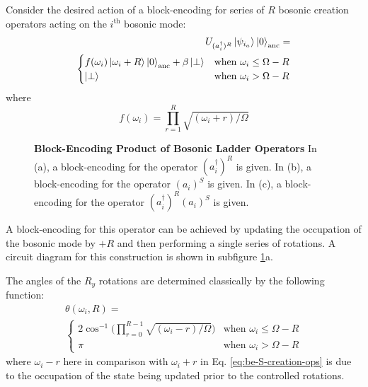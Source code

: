 Consider the desired action of a block-encoding for series of $R$ bosonic creation operators acting on the $i^\text{th}$ bosonic mode:
\begin{equation}
    \label{eq:be-S-creation-ops}
    \begin{split}
        U_{(a^\dagger_i)^R} \ket{\psi_{i_a}} \ket{0}_\text{anc} = \\
        \begin{cases}
            f(\omega_i) \ket{\omega_i + R} \ket{0}_\text{anc} + \beta \ket{\perp} & \text{when } \omega_i \leq \Omega - R \\
            \ket{\perp} & \text{when } \omega_i > \Omega - R \\
        \end{cases}
    \end{split}
\end{equation}
where
\begin{equation}
    f(\omega_i) = \prod_{r=1}^{R} \sqrt{(\omega_i + r) / \Omega}
\end{equation}

\begin{figure}
    
    
    
    \caption{
        \textbf{Block-Encoding Product of Bosonic Ladder Operators}
        In (a), a block-encoding for the operator $(a_i^\dagger)^R$ is given.
        In (b), a block-encoding for the operator $(a_i)^S$ is given.
        In (c), a block-encoding for the operator $(a_i^\dagger)^R (a_i)^S$ is given.
    }
    \label{fig:products-bosonic-operators}
\end{figure}

A block-encoding for this operator can be achieved by updating the occupation of the bosonic mode by $+R$ and then performing a single series of rotations.
A circuit diagram for this construction is shown in subfigure \ref{fig:products-bosonic-operators}a.

The angles of the $R_y$ rotations are determined classically by the following function:
\begin{equation}
    \begin{split}
        \theta(\omega_i, R) = \\
        \begin{cases} 
            2\cos^{-1}\Big(\prod_{r=0}^{R-1}\sqrt{(\omega_i - r) / \Omega}\Big) & \text{when } \omega_i \leq \Omega - R \\
            \pi & \text{when } \omega_i > \Omega - R
        \end{cases}
    \end{split}
\end{equation}
where $\omega_i - r$ here in comparison with $\omega_i + r$ in Eq. \ref{eq:be-S-creation-ops} is due to the occupation of the state being updated prior to the controlled rotations.

